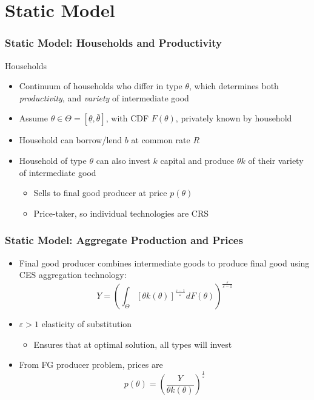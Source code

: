 \documentclass{beamer}
\begin{document}
\section{Static Model}
\begin{frame}
    \frametitle{Static Model: Households and Productivity}

    Households
    \begin{itemize}
        \item Continuum of households who differ in type \( \theta \), which determines both \textit{productivity}, and \textit{variety} of intermediate good
        \item Assume \( \theta\in\Theta=\left[ \underline{\theta}, \bar{\theta} \right] \), with CDF \( F(\theta) \), privately known by household
        \item Household can borrow/lend \( b \) at common rate \( R \)
        \item Household of type \( \theta \) can also invest \( k \) capital and produce \( \theta k \) of their variety of intermediate good 
        \begin{itemize}
            \item Sells to final good producer at price \( p(\theta) \) 
            \item Price-taker, so individual technologies are CRS
        \end{itemize}
    \end{itemize}

\end{frame}

\begin{frame}
    \frametitle{Static Model: Aggregate Production and Prices}

    
    \begin{itemize}
        \item Final good producer combines intermediate goods to produce final good using CES aggregation technology: 
        \begin{equation*}
            Y = \left(\int_{\Theta}\left[\theta k\left(\theta\right)\right]^{\frac{\varepsilon-1}{\varepsilon}}dF\left(\theta\right)\right)^{\frac{\varepsilon}{\varepsilon-1}} 
        \end{equation*} 
        \item \( \varepsilon>1 \) elasticity of substitution 
        \begin{itemize}
            \item Ensures that at optimal solution, all types will invest
        \end{itemize}
        \item From FG producer problem, prices are 
        \begin{equation*}
            p(\theta) = \left(\frac{Y}{\theta k\left(\theta\right)}\right)^{\frac{1}{\varepsilon}}
        \end{equation*}
    \end{itemize}

\end{frame}
\end{document}
